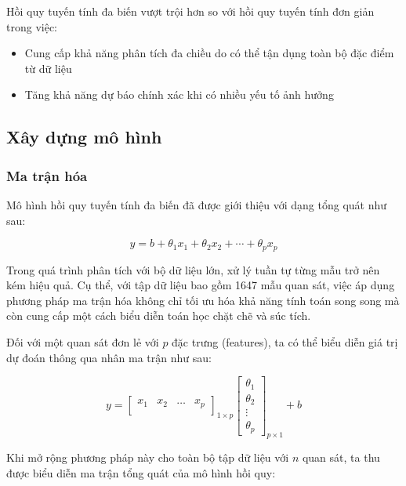 Hồi quy tuyến tính đa biến vượt trội hơn so với hồi quy tuyến tính đơn giản trong việc:

\begin{itemize}
    \item Cung cấp khả năng phân tích đa chiều do có thể tận dụng toàn bộ đặc điểm từ dữ liệu
    \item Tăng khả năng dự báo chính xác khi có nhiều yếu tố ảnh hưởng
\end{itemize}

\subsection{Xây dựng mô hình}
\subsubsection{Ma trận hóa}

Mô hình hồi quy tuyến tính đa biến đã được giới thiệu với dạng tổng quát như sau:

\begin{equation}
    y = b + \theta_1 x_1 + \theta_2 x_2 + \cdots + \theta_p x_p
\end{equation}

Trong quá trình phân tích với bộ dữ liệu lớn, xử lý tuần tự từng mẫu trở nên kém hiệu quả. Cụ thể, với tập dữ liệu bao gồm 1647 mẫu quan sát, việc áp dụng phương pháp ma trận hóa không chỉ tối ưu hóa khả năng tính toán song song mà còn cung cấp một cách biểu diễn toán học chặt chẽ và súc tích. 

Đối với một quan sát đơn lẻ với $p$ đặc trưng (features), ta có thể biểu diễn giá trị dự đoán thông qua nhân ma trận như sau:

\[
    y = 
    \begin{bmatrix}
        x_{1} & x_{2} & \dots & x_{p} \\
    \end{bmatrix}
    _{\text{$1 \times p$}}
    \begin{bmatrix}
        \theta_{1} \\
        \theta_{2} \\
        \vdots \\
        \theta_{p}
    \end{bmatrix}
    _{\text{$p \times 1$}}
    +
    b
\]

Khi mở rộng phương pháp này cho toàn bộ tập dữ liệu với $n$ quan sát, ta thu được biểu diễn ma trận tổng quát của mô hình hồi quy:

